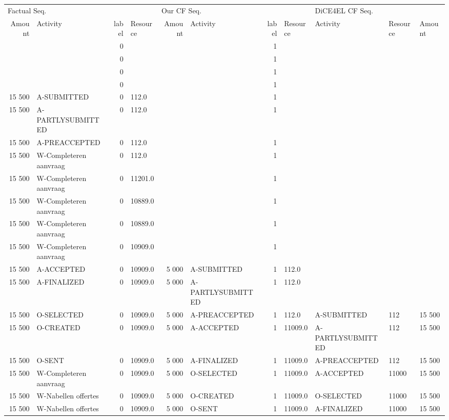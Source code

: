 \begin{tabular}{rlrlrlrllll}
\toprule
\multicolumn{4}{l}{Factual Seq.} & \multicolumn{4}{l}{Our CF Seq.} & \multicolumn{3}{l}{DiCE4EL CF Seq.} \\
Amount & Activity & label & Resource & Amount & Activity & label & Resource & Activity & Resource & Amount \\
\midrule
 &  & 0 &  &  &  & 1 &  &  &  &  \\
 &  & 0 &  &  &  & 1 &  &  &  &  \\
 &  & 0 &  &  &  & 1 &  &  &  &  \\
 &  & 0 &  &  &  & 1 &  &  &  &  \\
15 500 & A-SUBMITTED & 0 & 112.0 &  &  & 1 &  &  &  &  \\
15 500 & A-PARTLYSUBMITTED & 0 & 112.0 &  &  & 1 &  &  &  &  \\
15 500 & A-PREACCEPTED & 0 & 112.0 &  &  & 1 &  &  &  &  \\
15 500 & W-Completeren aanvraag & 0 & 112.0 &  &  & 1 &  &  &  &  \\
15 500 & W-Completeren aanvraag & 0 & 11201.0 &  &  & 1 &  &  &  &  \\
15 500 & W-Completeren aanvraag & 0 & 10889.0 &  &  & 1 &  &  &  &  \\
15 500 & W-Completeren aanvraag & 0 & 10889.0 &  &  & 1 &  &  &  &  \\
15 500 & W-Completeren aanvraag & 0 & 10909.0 &  &  & 1 &  &  &  &  \\
15 500 & A-ACCEPTED & 0 & 10909.0 & 5 000 & A-SUBMITTED & 1 & 112.0 &  &  &  \\
15 500 & A-FINALIZED & 0 & 10909.0 & 5 000 & A-PARTLYSUBMITTED & 1 & 112.0 &  &  &  \\
15 500 & O-SELECTED & 0 & 10909.0 & 5 000 & A-PREACCEPTED & 1 & 112.0 & A-SUBMITTED & 112 & 15 500 \\
15 500 & O-CREATED & 0 & 10909.0 & 5 000 & A-ACCEPTED & 1 & 11009.0 & A-PARTLYSUBMITTED & 112 & 15 500 \\
15 500 & O-SENT & 0 & 10909.0 & 5 000 & A-FINALIZED & 1 & 11009.0 & A-PREACCEPTED & 112 & 15 500 \\
15 500 & W-Completeren aanvraag & 0 & 10909.0 & 5 000 & O-SELECTED & 1 & 11009.0 & A-ACCEPTED & 11000 & 15 500 \\
15 500 & W-Nabellen offertes & 0 & 10909.0 & 5 000 & O-CREATED & 1 & 11009.0 & O-SELECTED & 11000 & 15 500 \\
15 500 & W-Nabellen offertes & 0 & 10909.0 & 5 000 & O-SENT & 1 & 11009.0 & A-FINALIZED & 11000 & 15 500 \\

\end{tabular}
